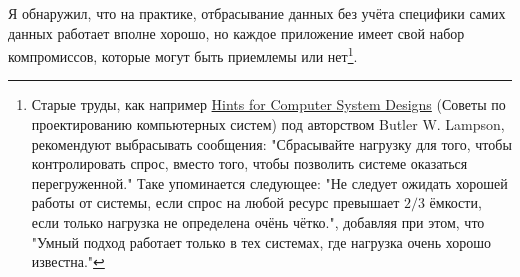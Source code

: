 \documentclass[11pt, oneside]{book}   	%
\begin{document}
Я обнаружил, что на практике, отбрасывание данных без учёта специфики самих данных работает вполне хорошо, но каждое приложение имеет свой набор компромиссов, которые могут быть приемлемы или нет\footnote{Старые труды, как например \href{http://research.microsoft.com/en-us/um/people/blampson/33-hints/webpage.html}{Hints for Computer System Designs} (Советы по проектированию компьютерных систем) под авторством Butler W. Lampson, рекомендуют выбрасывать сообщения: "Сбрасывайте нагрузку для того, чтобы контролировать спрос, вместо того, чтобы позволить системе оказаться перегруженной." Таке упоминается следующее: "Не следует ожидать хорошей работы от системы, если спрос на любой ресурс превышает $2/3$ ёмкости, если только нагрузка не определена очёнь чётко.", добавляя при этом, что "Умный подход работает только в тех системах, где нагрузка очень хорошо известна."}.
\end{document}
